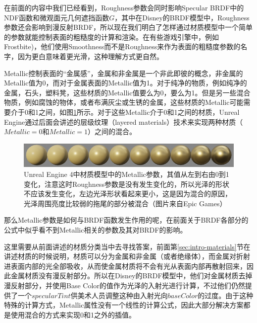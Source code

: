 在前面的内容中我们已经看到，Roughness参数会同时影响Specular BRDF中的NDF函数和微观面元几何遮挡函数$G$，其中在Disney的BRDF模型中，Roughness参数还会影响到漫反射BRDF，所以现在我们明白了怎样通过材质模型中一个简单的参数就能控制表面的粗糙度的计算和渲染。在有些游戏引擎中，例如Frostbite\cite{a:MovingFrostbitetoPBR})，他们使用Smoothness而不是Roughness来作为表面的粗糙度参数的名字，因为更白意味着更光滑，这种理解方式更自然。

Metallic控制表面的“金属感”，金属和非金属是一个非此即彼的概念，非金属的Metallic值为0，而对于金属表面的Metallic值为1。对于纯净的物质，例如纯净的金属，石头，塑料凳，这些材质的Metallic值要么为0，要么为1。但是另一些混合物质，例如腐蚀的物体，或者布满灰尘或生锈的金属，这些材质的Metallic可能需要介于0和1之间，如图\ref{f:intro-ue4-material-metallic}所示。对于这些Metallic介于0和1之间的材质，Unreal Engine通过后面会讲述的层级纹理（layered materials）技术来实现两种材质（$Metallic=0$和$Metallic=1$）之间的混合。

\begin{figure}
\begin{fullwidth}
	\includegraphics[width=1.\thewidth]{graphics/gi/metallic}
\caption{Unreal Engine 4中材质模型中的Metallic参数，其值从左到右由0到1变化，注意这时Roughness参数是没有发生变化的，所以光泽的形状不应该发生变化，左边光泽形状看起来更小，这是因为混合的原因，光泽周围亮度比较弱的拖尾的部分被混合（图片来自Epic Games）}
\label{f:intro-ue4-material-metallic}
\end{fullwidth}
\end{figure}

那么Metallic参数是如何与BRDF函数发生作用的呢，在前面关于BRDF各部分的公式中似乎看不到Metallic相关的参数及其对BRDF的影响。

这里需要从前面讲述的材质分类当中去寻找答案，前面第\ref{sec:intro-materials}节在讲述材质的时候说明，材质可以分为金属和非金属（或者绝缘体），而金属对折射进表面内部的光全部吸收，从而使金属材质将不会有光从表面内部再散射回来，因此金属材质没有漫反射部分。所以在Disney的BRDF模型中，他们对金属材质去掉漫反射部分，并使用Base Color的值作为光泽的入射光进行计算，不过他们仍然提供了一个$specularTint$供美术人员调整这种由入射光向$baseColor$的过度。由于这种特殊的计算方式，Metallic属性没有一个线性的计算公式，因此大部分解决方案都是使用混合的方式来实现0和1之外的插值。

